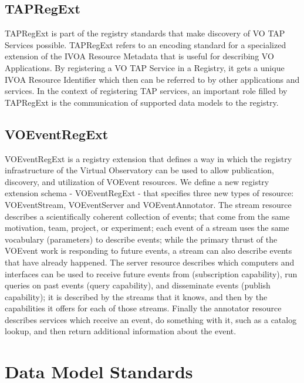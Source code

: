 \documentclass[11pt,a4paper]{ivoa}
\begin{document}
\subsection{TAPRegExt}

TAPRegExt is part of the registry standards that make discovery of VO TAP Services possible.  TAPRegExt refers to an encoding standard for a specialized extension of the IVOA Resource Metadata that is useful for describing VO Applications.  By registering a VO TAP Service in a Registry, it gets a unique IVOA Resource Identifier which then can be referred to by other applications and services.  In the context of registering TAP services, an important role filled by TAPRegExt is the communication of supported data models to the registry.

\subsection{VOEventRegExt}

VOEventRegExt is a registry extension that defines a way in which the registry infrastructure of the 
Virtual Observatory can be used to allow publication, discovery, and utilization of VOEvent 
resources. We define a new registry extension schema - VOEventRegExt - that specifies three 
new types of resource: VOEventStream, VOEventServer and VOEventAnnotator. The stream resource 
describes a scientifically coherent collection of events; that come from the same motivation, 
team, project, or experiment; each event of a stream uses the same vocabulary (parameters) to 
describe events; while the primary thrust of the VOEvent work is responding to future events, 
a stream can also describe events that have already happened. The server resource describes 
which computers and interfaces can be used to receive future events from (subscription capability), 
run queries on past events (query capability), and disseminate events (publish capability); 
it is described by the streams that it knows, and then by the capabilities it offers for each 
of those streams. Finally the annotator resource describes services which receive an event, 
do something with it, such as a catalog lookup, and then return additional information about 
the event. 

\section{Data Model Standards}
\end{document}
